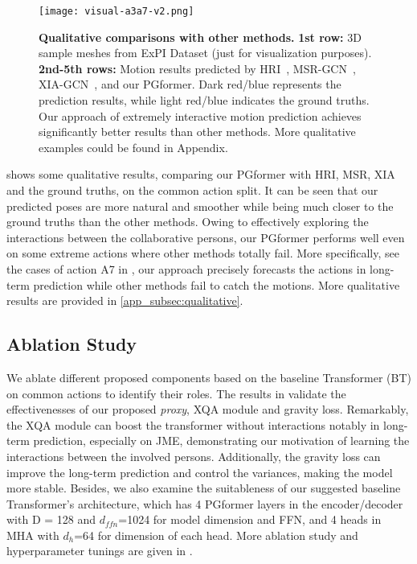 \documentclass[10pt,twocolumn,letterpaper]{article}
\begin{document}
\begin{figure*}[ht]
    \vskip -0.2in
	\begin{center}
		\centerline{\texttt{[image: visual-a3a7-v2.png]}} \caption{\textbf{Qualitative comparisons with other methods.} 
        \textbf{1st row:} 3D sample meshes from ExPI Dataset (just for visualization purposes). 
        \textbf{2nd-5th rows:} Motion results predicted by HRI~\cite{mao2020history}, MSR-GCN~\cite{dang2021msr}, XIA-GCN~\cite{guo2021multi}, and our PGformer. 
        Dark red/blue represents the prediction results, while light red/blue indicates the ground truths. 
        Our approach of extremely interactive motion prediction achieves significantly better results than other methods. 
        More qualitative examples could be found in Appendix.}
		\label{fig:visual_a3a7}
	\end{center}
  \vskip -0.4in
\end{figure*}

 shows some qualitative results, comparing our PGformer with HRI, MSR, XIA and the ground truths, on the common action split. 
It can be seen that our predicted poses are more natural and smoother while being much closer to the ground truths than the other methods. 
Owing to effectively exploring the interactions between the collaborative persons, our PGformer performs well even on some extreme actions where other methods totally fail. 
More specifically, see the cases of action A7 in , our approach precisely forecasts the actions in long-term prediction while other methods fail to catch the motions.
More qualitative results are provided in \cref{app_subsec:qualitative}.



\subsection{Ablation Study}
We ablate different proposed components based on the baseline Transformer (BT) on common actions to identify their roles.
The results in  validate the effectivenesses of our proposed \textit{proxy}, XQA module and gravity loss. 
Remarkably, the XQA module can boost the transformer without interactions notably in long-term prediction, especially on JME, demonstrating our motivation of learning the interactions between the involved persons. 
Additionally, the gravity loss can improve the long-term prediction and control the variances, making the model more stable. 
Besides, we also examine the suitableness of our suggested baseline Transformer's architecture, which has 4 PGformer layers in the encoder/decoder with D = 128 and $d_{ffn}$=1024 for model dimension and FFN, and 4 heads in MHA with $d_h$=64 for dimension of each head.
More ablation study and hyperparameter tunings are given in .
\end{document}
